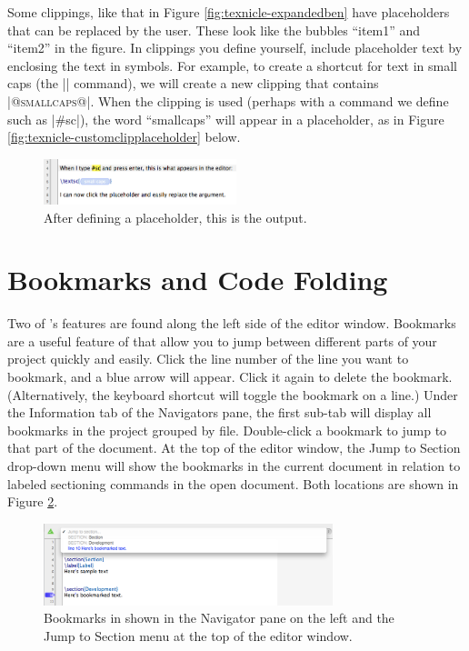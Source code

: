 Some clippings, like that in Figure \ref{fig:texnicle-expandedben} have placeholders that can be replaced by the user. These look like the bubbles ``item1'' and ``item2'' in the figure. In clippings you define yourself, include placeholder text by enclosing the text in \@ symbols. For example, to create a shortcut for text in small caps (the |\smallcaps| command), we will create a new clipping that contains |\textsc{@smallcaps@}|. When the clipping is used (perhaps with a command we define such as |#sc|), the word ``smallcaps'' will appear in a placeholder, as in Figure \ref{fig:texnicle-customclipplaceholder} below.
\begin{figure}[htbp]
\centering
\includegraphics[width=0.5\textwidth]{TeXnicle-Images/texnicle-customcliptag.png}
\caption{After defining a placeholder, this is the output.}
\label{fig:texnicle-customcliptag}
\end{figure}

\section{Bookmarks and Code Folding}
\label{reference.bookmarksfolding}
Two of \texnicle's features are found along the left side of the editor window. Bookmarks are a useful feature of \texnicle that allow you to jump between different parts of your project quickly and easily. Click the line number of the line you want to bookmark, and a blue arrow will appear. Click it again to delete the bookmark. (Alternatively, the keyboard shortcut  will toggle the bookmark on a line.) Under the Information tab of the Navigators pane, the first sub-tab will display all bookmarks in the project grouped by file. Double-click a bookmark to jump to that part of the document. At the top of the editor window, the Jump to Section drop-down menu will show the bookmarks in the current document in relation to labeled sectioning commands in the open document. Both locations are shown in Figure \ref{fig:texnicle-bookmarks}.
\begin{figure}[htbp]
\centering
\includegraphics[width=0.75\textwidth]{TeXnicle-Images/texnicle-bookmarks.png}
\caption{Bookmarks in \texnicle shown in the Navigator pane on the left and the Jump to Section menu at the top of the editor window.}
\label{fig:texnicle-bookmarks}
\end{figure}


